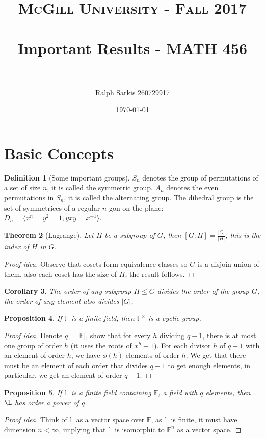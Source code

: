 \documentclass[paper=a4, fontsize=12pt]{scrartcl} %
\title{	
\normalfont \normalsize 
\textsc{McGill University - Fall 2017} \\ [0pt] %
\horrule{0.5pt} \\[0.4cm] %
\huge Important Results - MATH 456 \\ %
\horrule{2pt} \\[0cm] %
}
\author{Ralph Sarkis 260729917} %
\date{\normalsize\today} %
\newtheorem{thm}{Theorem}[section]
\newtheorem{cor}[thm]{Corollary}
\newtheorem{prop}[thm]{Proposition}
\theoremstyle{definition}
\newtheorem{defn}[thm]{Definition}
\theoremstyle{remark}
\newcommand{\F}{\mathbb{F}}
\numberwithin{equation}{section} %
\numberwithin{figure}{section} %
\numberwithin{table}{section} %
\begin{document}
\maketitle %
\section{Basic Concepts}
\begin{defn}[Some important groups]
	$S_n$ denotes the group of permutations of a set of size $n$, it is called the symmetric group. $A_n$ denotes the even permutations in $S_n$, it is called the alternating group. The dihedral group is the set of symmetrices of a regular $n$-gon on the plane: $D_n = \langle x^n=y^2=1, yxy = x^{-1} \rangle$.
\end{defn}
\begin{thm}[Lagrange]
	Let $H$ be a subgroup of $G$, then $[G:H] = \frac{|G|}{|H|}$, this is the index of $H$ in $G$.
\end{thm}
\begin{proof}[Proof idea]
	Observe that cosets form equivalence classes so $G$ is a disjoin union of them, also each coset has the size of $H$, the result follows.
\end{proof}
\begin{cor}
	The order of any subgroup $H \leq G$ divides the order of the group $G$, the order of any element also divides $|G|$.
\end{cor}
\begin{prop}
	If $\F$ is a finite field, then $\F^{\times}$ is a cyclic group.
\end{prop}
\begin{proof}[Proof idea]
	Denote $q = |\F|$, show that for every $h$ dividing $q-1$, there is at most one group of order $h$ (it uses the roots of $x^h -1$). For each divisor $h$ of $q-1$ with an element of order $h$, we have $\phi(h)$ elements of order $h$. We get that there must be an element of each order that divides $q-1$ to get enough elements, in particular, we get an element of order $q-1$.
\end{proof}
\begin{prop}
	If $\mathbb{L}$ is a finite field containing $\F$, a field with $q$ elements, then $\L$ has order a power of $q$.
\end{prop}
\begin{proof}[Proof idea]
	Think of $\mathbb{L}$ as a vector space over $\F$, as $\mathbb{L}$ is finite, it must have dimension $n < \infty$, implying that $\mathbb{L}$ is isomorphic to $\F^n$ as a vector space.
\end{proof}
\end{document}
